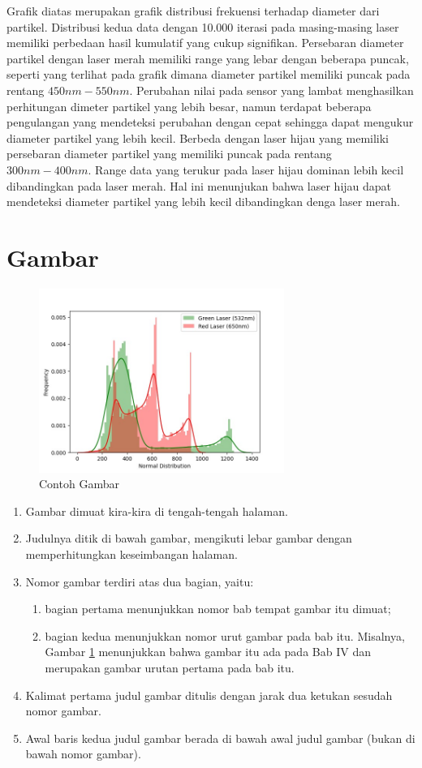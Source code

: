 Grafik diatas merupakan grafik distribusi frekuensi terhadap
diameter dari partikel. Distribusi kedua data dengan 10.000
iterasi pada masing-masing laser memiliki perbedaan hasil
kumulatif yang cukup signifikan. Persebaran diameter partikel
dengan laser merah memiliki range yang lebar dengan beberapa
puncak, seperti yang terlihat pada grafik dimana diameter
partikel memiliki puncak pada rentang ${450nm-550nm}$. Perubahan
nilai pada sensor yang lambat menghasilkan perhitungan dimeter
partikel yang lebih besar, namun terdapat beberapa pengulangan
yang mendeteksi perubahan dengan cepat sehingga dapat mengukur
diameter partikel yang lebih kecil. Berbeda dengan laser hijau
yang memiliki persebaran diameter partikel yang memiliki puncak
pada rentang ${300nm-400nm}$. Range data yang terukur pada laser
hijau dominan lebih kecil dibandingkan pada laser merah. Hal ini
menunjukan bahwa laser hijau dapat mendeteksi diameter partikel
yang lebih kecil dibandingkan denga laser merah.



\section{Gambar}

\begin{figure}[H]
  \centering
  \includegraphics[width=8cm]{Images/Distribusi 1000x.jpg}
  \caption{Contoh Gambar}
  \label{fig:blg}
\end{figure}

\begin{enumerate}
  \item Gambar dimuat kira-kira di tengah-tengah halaman.
  \item Judulnya ditik di bawah gambar, mengikuti lebar gambar dengan memperhitungkan keseimbangan halaman.
  \item Nomor gambar terdiri atas dua bagian, yaitu:
  \begin{enumerate}[label=(\alph*)]
    \item bagian pertama menunjukkan nomor bab tempat gambar itu dimuat;
    \item bagian kedua menunjukkan nomor urut gambar pada bab itu. Misalnya, Gambar  \ref{fig:blg} menunjukkan bahwa gambar itu ada pada Bab IV dan merupakan gambar urutan pertama pada bab itu.
  \end{enumerate}
  \item Kalimat pertama judul gambar ditulis dengan jarak dua ketukan sesudah nomor gambar.
  \item Awal baris kedua judul gambar berada di bawah awal judul gambar (bukan di bawah nomor gambar).
\end{enumerate}

